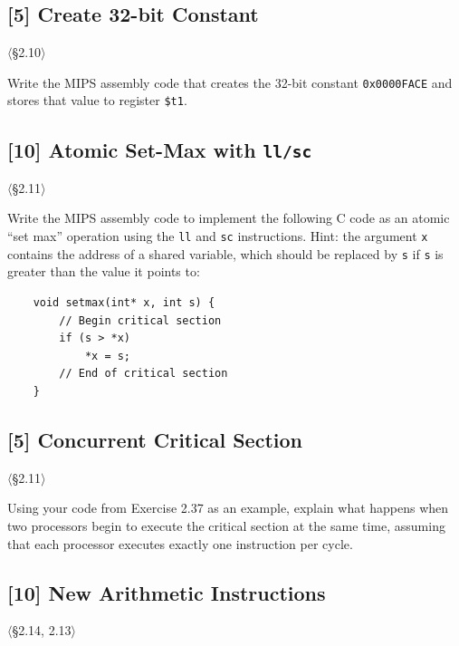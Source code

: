 \problembreak

\subsection{[5] Create 32-bit Constant}
\hypertarget{prob-2.36}{}
\noindent$\langle$\S2.10$\rangle$\medskip

\noindent Write the MIPS assembly code that creates the 32-bit constant
\texttt{0x0000FACE} and stores that value to register \texttt{\$t1}.

\problembreak

\subsection{[10] Atomic Set-Max with \texttt{ll/sc}}
\hypertarget{prob-2.37}{}
\noindent$\langle$\S2.11$\rangle$\medskip

\noindent Write the MIPS assembly code to implement the following C code as an
atomic ``set max'' operation using the \texttt{ll} and \texttt{sc}
instructions. Hint: the argument \texttt{x} contains the address of a shared
variable, which should be replaced by \texttt{s} if \texttt{s} is greater
than the value it points to:
\begin{verbatim}
    void setmax(int* x, int s) {
        // Begin critical section
        if (s > *x)
            *x = s;
        // End of critical section
    }
\end{verbatim}

\problembreak

\subsection{[5] Concurrent Critical Section}
\hypertarget{prob-2.38}{}
\noindent$\langle$\S2.11$\rangle$\medskip

\noindent Using your code from Exercise 2.37 as an example, explain what
happens when two processors begin to execute the critical section at the same
time, assuming that each processor executes exactly one instruction per cycle.

\problembreak

\subsection{[10] New Arithmetic Instructions}
\hypertarget{prob-2.39}{}
\noindent$\langle$\S2.14, 2.13$\rangle$\medskip

